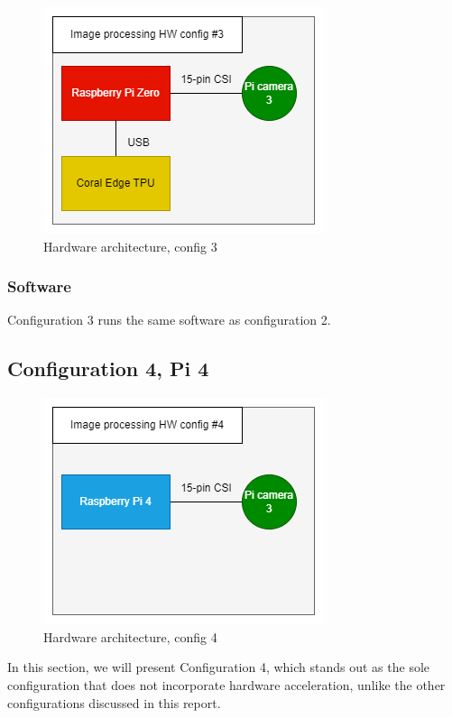 \begin{figure}[H]
    \centering
    \includegraphics[scale=0.5]{fig/config3_hw.png}
    \caption{Hardware architecture, config 3}
    \label{fig:config3_hw}
\end{figure}

\subsubsection{Software}

Configuration 3 runs the same software as configuration 2.

\subsection{Configuration 4, Pi 4}

\begin{figure}[h]
    \centering
    \includegraphics[scale=0.5]{fig/config4_hw.png}
    \caption{Hardware architecture, config 4}
    \label{fig:config4_hw}
\end{figure}

In this section, we will present Configuration 4, which stands out as the sole configuration that does not incorporate hardware acceleration, unlike the other configurations discussed in this report.

